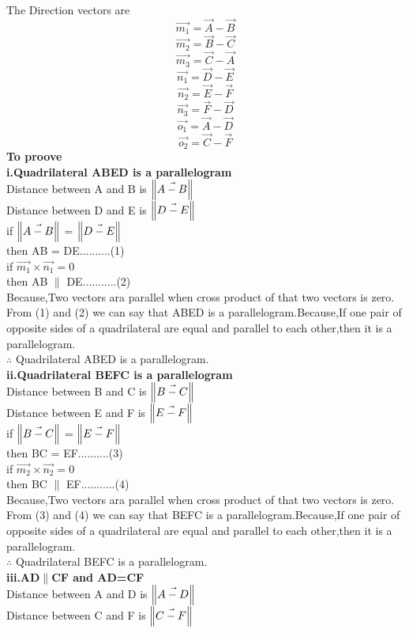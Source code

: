 \documentclass[10pt, a4paper]{article}
\begin{document}
The Direction vectors are
\boldmath
$$\vec{m_1}={\vec{A}-\vec{B}} $$
$$\vec{m_2}={\vec{B}-\vec{C}} $$
$$\vec{m_3}={\vec{C}-\vec{A}} $$
$$\vec{n_1}={\vec{D}-\vec{E}} $$
$$\vec{n_2}={\vec{E}-\vec{F}} $$
$$\vec{n_3}={\vec{F}-\vec{D}} $$
$$\vec{o_1}={\vec{A}-\vec{D}} $$
$$\vec{o_2}={\vec{C}-\vec{F}} $$
\unboldmath
\textbf{To proove\\ i.Quadrilateral ABED is a parallelogram}\\
    Distance between A and B is $\norm{\vec{A-B}}$\\
	Distance between D and E is $\norm{\vec{D-E}}$\\
	if $\norm{\vec{A-B}}$ =  $\norm{\vec{D-E}}$\\
	then AB = DE..........(1)\\
	if $\vec{m_1} \times \vec{n_1}=0$\\
	then AB $\parallel$ DE...........(2)\\
	Because,Two vectors ara parallel when cross product of that two vectors is zero.\\
	From (1) and (2) we can say that ABED is a parallelogram.Because,If one pair of opposite sides of a quadrilateral are equal and parallel to each other,then it is a parallelogram.\\
	$\therefore$ Quadrilateral ABED is a parallelogram.\\ 
\textbf{ii.Quadrilateral BEFC is a parallelogram}\\
    Distance between B and C is $\norm{\vec{B-C}}$\\
	Distance between E and F is $\norm{\vec{E-F}}$\\
	if $\norm{\vec{B-C}}$ =  $\norm{\vec{E-F}}$\\
	then BC = EF..........(3)\\
	if $\vec{m_2} \times \vec{n_2}=0$\\
	then BC $\parallel$ EF...........(4)\\
	Because,Two vectors ara parallel when cross product of that two vectors is zero.\\
	From (3) and (4) we can say that BEFC is a parallelogram.Because,If one pair of opposite sides of a quadrilateral are equal and parallel to each other,then it is a parallelogram.\\
	$\therefore$ Quadrilateral BEFC is a parallelogram.\\ 	
\textbf{iii.AD$\parallel$CF and AD=CF}\\
    Distance between A and D is $\norm{\vec{A-D}}$\\
	Distance between C and F is $\norm{\vec{C-F}}$\\
\end{document}
